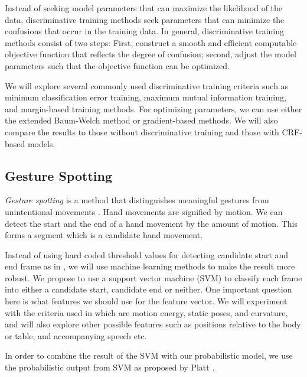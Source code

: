 Instead of seeking model parameters that can maximize the likelihood of the
data, discriminative training methods seek parameters that can minimize the
confusions that occur in the training data. In general, discriminative training
methods consist of two steps: First, construct a smooth and efficient computable
objective function that reflects the degree of confusion; second, adjust the
model parameters such that the objective function can be optimized. 

We will explore several commonly used discriminative training criteria such as
minimum classification error training, maximum mutual
information training, and margin-based training methods. For optimizing
parameters, we can use either the extended Baum-Welch method or gradient-based
methods. We will also compare the results to those without discriminative
training and those with CRF-based models.

\subsection{Gesture Spotting}
\textit{Gesture spotting} is a method that
distinguishes meaningful gestures from unintentional movements \cite{kang04}.
Hand movements are signified by motion. We can detect the start and the end of a hand movement by the amount of motion. This forms a segment
which is a candidate hand movement. 

Instead of using hard coded threshold values for detecting candidate
start and end frame as in \cite{kang04}, we will use machine learning methods to
make the result more robust. We propose to use a support vector machine (SVM) to
classify each frame into either a candidate start, candidate end or neither. One
important question here is what features we should use for the feature vector.
We will experiment with the criteria used in \cite{kang04} which are motion
energy, static poses, and curvature, and will also explore other possible
features such as positions relative to the body or table, and accompanying
speech etc.

In order to combine the result of the SVM with our probabilistic model, we use
the probabilistic output from SVM as proposed by Platt \cite{platt99}.

